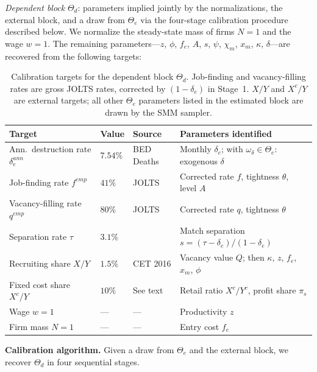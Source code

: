 \documentclass[authoryear, review, 12pt]{elsarticle}
\newcommand{\ra}[1]{\renewcommand{\arraystretch}{#1}}
\begin{document}
	\emph{Dependent block} $\Theta_d$: parameters implied jointly by the
	normalizations, the external block, and a draw from $\Theta_e$ via the
	four-stage calibration procedure described below. We normalize the steady-state
	mass of firms $N=1$ and the wage $w=1$. The remaining parameters—$z$, $\phi$,
	$f_e$, $A$, $s$, $\psi$, $\chi_m$, $x_m$, $\kappa$, $\delta$—are recovered from
	the following targets:
	\begin{table}[h!]
		\centering
		\caption{Calibration targets for the dependent block $\Theta_d$.
			Job-finding and vacancy-filling rates are gross JOLTS rates,
			corrected by $(1-\delta_e)$ in Stage~1.
			$X/Y$ and $X^c/Y$ are external targets; all other $\Theta_e$
			parameters listed in the estimated block are drawn by the SMM sampler.}
		\label{tab:calib_targets}
		\ra{1.2}
		\small
		\begin{tabular}{@{}lp{1.4cm}p{2.8cm}p{5.8cm}@{}}
			\toprule
			Target & Value & Source & Parameters identified \\
			\midrule
			Ann.\ destruction rate $\delta_e^{ann}$ & $7.54\%$ &
			BED Deaths &
			Monthly $\delta_e$; with $\omega_\delta\in\Theta_e$: exogenous $\delta$ \\
			Job-finding rate $f^{emp}$ & $41\%$ &
			JOLTS &
			Corrected rate $f$, tightness $\theta$, level $A$ \\
			Vacancy-filling rate $q^{emp}$ & $80\%$ &
			JOLTS &
			Corrected rate $q$, tightness $\theta$ \\
			Separation rate $\tau$ & $3.1\%$ &
			\citet{shimer_2005} &
			Match separation $s=(\tau-\delta_e)/(1-\delta_e)$ \\
			Recruiting share $X/Y$ & $1.5\%$ &
			CET 2016 &
			Vacancy value $Q$; then $\kappa$, $z$, $f_e$, $x_m$, $\phi$ \\
			Fixed cost share $X^c/Y$ & $10\%$ &
			See text &
			Retail ratio $X^c/Y^c$, profit share $\pi_s$ \\
			Wage $w=1$ & --- & --- & Productivity $z$ \\
			Firm mass $N=1$ & --- & --- & Entry cost $f_e$ \\
			\bottomrule
		\end{tabular}
	\end{table}
	
	\normalsize
	\medskip\noindent\textbf{Calibration algorithm.}
	Given a draw from $\Theta_e$ and the external block, we recover $\Theta_d$ in
	four sequential stages.
	
\end{document}
